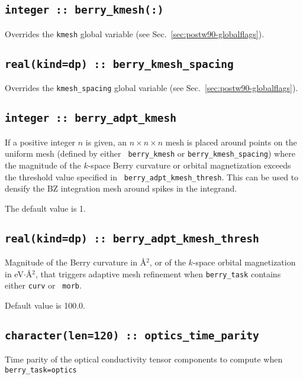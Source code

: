 \subsection[berry\_kmesh]{\tt integer :: berry\_kmesh(:)}
Overrides the \verb#kmesh# global variable (see
Sec.~\ref{sec:postw90-globalflags}).

\subsection[berry\_kmesh\_spacing]{\tt real(kind=dp) :: berry\_kmesh\_spacing}
Overrides the \verb#kmesh_spacing# global variable (see
Sec.~\ref{sec:postw90-globalflags}).


\subsection[berry\_adpt\_kmesh]{\tt integer :: berry\_adpt\_kmesh}
If a positive integer $n$ is given, an $n\times n\times n$ mesh is
placed around points on the uniform mesh (defined by either {\tt
  berry\_kmesh} or {\tt berry\_kmesh\_spacing}) where
the magnitude of the $k$-space Berry curvature or orbital
magnetization exceeds the threshold value specified in {\tt
  berry\_adpt\_kmesh\_thresh}. This can be used to densify the BZ
integration mesh around spikes in the integrand.

The default value is 1.


\subsection[berry\_adpt\_kmesh\_thresh]{\tt real(kind=dp) :: berry\_adpt\_kmesh\_thresh}

Magnitude of the Berry curvature in \AA$^2$, or of the $k$-space
orbital magnetization in eV$\cdot$\AA$^2$, that triggers adaptive mesh
refinement when {\tt berry\_task} contains either {\tt curv} or {\tt
  morb}.

Default value is 100.0.

\subsection[berry\_spectrum\_time\_parity]{\tt character(len=120) ::  optics\_time\_parity}
Time parity of the optical conductivity tensor components to compute
when {\tt berry\_task=optics}

